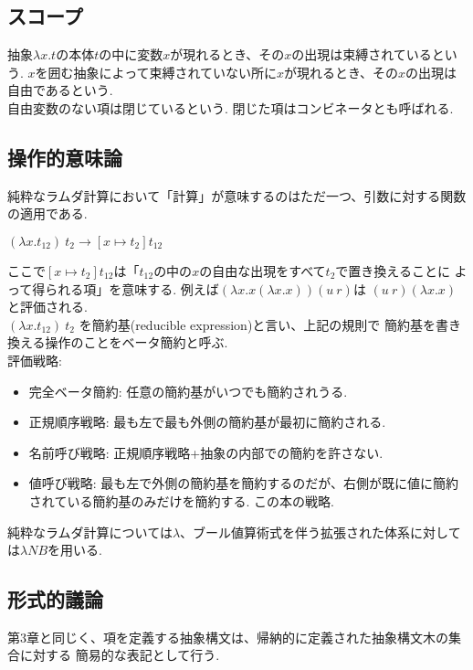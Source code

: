 \documentclass[a4paper,10pt]{article}
\begin{document}
\subsection*{スコープ}
抽象$\lambda x. t$の本体$t$の中に変数$x$が現れるとき、その$x$の出現は束縛されているという.
$x$を囲む抽象によって束縛されていない所に$x$が現れるとき、その$x$の出現は自由であるという.\\
自由変数のない項は閉じているという. 閉じた項はコンビネータとも呼ばれる.
\subsection*{操作的意味論}
純粋なラムダ計算において「計算」が意味するのはただ一つ、引数に対する関数の適用である.
\begin{center}
    $(\lambda x. t_{12})\ t_2 \rightarrow [x \mapsto t_2] t_{12}$
\end{center}
ここで$[x \mapsto t_2] t_{12}$は「$t_{12}$の中の$x$の自由な出現をすべて$t_2$で置き換えることに
よって得られる項」を意味する. 例えば$(\lambda x. x (\lambda x. x))(u\ r)$は
$(u\ r) (\lambda x. x)$と評価される.\\
$(\lambda x. t_{12})\ t_2$ を簡約基(reducible expression)と言い、上記の規則で
簡約基を書き換える操作のことをベータ簡約と呼ぶ.\\
評価戦略:
\begin{itemize}
    \item 完全ベータ簡約: 任意の簡約基がいつでも簡約されうる.
    \item 正規順序戦略: 最も左で最も外側の簡約基が最初に簡約される.
    \item 名前呼び戦略: 正規順序戦略+抽象の内部での簡約を許さない.
    \item 値呼び戦略: 最も左で外側の簡約基を簡約するのだが、右側が既に値に簡約されている簡約基のみだけを簡約する. 
    この本の戦略.
\end{itemize}
純粋なラムダ計算については$\lambda$、ブール値算術式を伴う拡張された体系に対しては$\lambda NB$を用いる.
\subsection*{形式的議論}
第3章と同じく、項を定義する抽象構文は、帰納的に定義された抽象構文木の集合に対する
簡易的な表記として行う.
\end{document}

